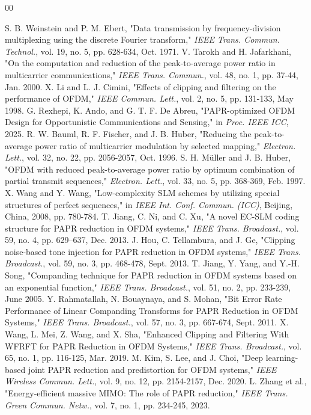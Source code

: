 \documentclass[conference]{IEEEtran}
\begin{document}
\begin{thebibliography}{00}

     S. B. Weinstein and P. M. Ebert, "Data transmission by frequency-division multiplexing using the discrete Fourier transform," \textit{IEEE Trans. Commun. Technol.}, vol. 19, no. 5, pp. 628-634, Oct. 1971.
     V. Tarokh and H. Jafarkhani, "On the computation and reduction of the peak-to-average power ratio in multicarrier communications," \textit{IEEE Trans. Commun.}, vol. 48, no. 1, pp. 37-44, Jan. 2000.
     X. Li and L. J. Cimini, "Effects of clipping and filtering on the performance of OFDM," \textit{IEEE Commun. Lett.}, vol. 2, no. 5, pp. 131-133, May 1998.
     G. Rexhepi, K. Ando, and G. T. F. De Abreu, "PAPR-optimized OFDM Design for Opportunistic Communications and Sensing," in \textit{Proc. IEEE ICC}, 2025.
     R. W. Bauml, R. F. Fischer, and J. B. Huber, "Reducing the peak-to-average power ratio of multicarrier modulation by selected mapping," \textit{Electron. Lett.}, vol. 32, no. 22, pp. 2056-2057, Oct. 1996.
     S. H. Müller and J. B. Huber, "OFDM with reduced peak-to-average power ratio by optimum combination of partial transmit sequences," \textit{Electron. Lett.}, vol. 33, no. 5, pp. 368-369, Feb. 1997.
     X. Wang and Y. Wang, "Low-complexity SLM schemes by utilizing special structures of perfect sequences," in \textit{IEEE Int. Conf. Commun. (ICC)}, Beijing, China, 2008, pp. 780-784.
     T. Jiang, C. Ni, and C. Xu, "A novel EC-SLM coding structure for PAPR reduction in OFDM systems," \textit{IEEE Trans. Broadcast.}, vol. 59, no. 4, pp. 629–637, Dec. 2013.
     J. Hou, C. Tellambura, and J. Ge, "Clipping noise-based tone injection for PAPR reduction in OFDM systems," \textit{IEEE Trans. Broadcast.}, vol. 59, no. 3, pp. 468-478, Sept. 2013.
     T. Jiang, Y. Yang, and Y.-H. Song, "Companding technique for PAPR reduction in OFDM systems based on an exponential function," \textit{IEEE Trans. Broadcast.}, vol. 51, no. 2, pp. 233-239, June 2005.
     Y. Rahmatallah, N. Bouaynaya, and S. Mohan, "Bit Error Rate Performance of Linear Companding Transforms for PAPR Reduction in OFDM Systems," \textit{IEEE Trans. Broadcast.}, vol. 57, no. 3, pp. 667-674, Sept. 2011.
     X. Wang, L. Mei, Z. Wang, and X. Sha, "Enhanced Clipping and Filtering With WFRFT for PAPR Reduction in OFDM Systems," \textit{IEEE Trans. Broadcast.}, vol. 65, no. 1, pp. 116-125, Mar. 2019.
     M. Kim, S. Lee, and J. Choi, "Deep learning-based joint PAPR reduction and predistortion for OFDM systems," \textit{IEEE Wireless Commun. Lett.}, vol. 9, no. 12, pp. 2154-2157, Dec. 2020.
     L. Zhang et al., "Energy-efficient massive MIMO: The role of PAPR reduction," \textit{IEEE Trans. Green Commun. Netw.}, vol. 7, no. 1, pp. 234-245, 2023.

\end{thebibliography}
\end{document}
